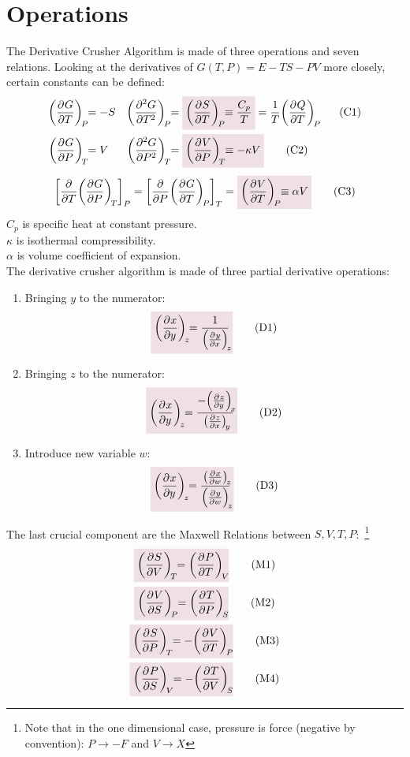 \documentclass{article}
\begin{document}
\section*{Operations}
    The Derivative Crusher Algorithm is made of three operations and seven relations. 
    Looking at the derivatives of $G(T,P)=E-TS-PV$ more closely, certain constants can be defined: 
    \begin{align*}
        \pder{G}{T}[P]&=-S & \pder[2]{G}{T}[P]&=\coloredanswer{\pder{S}{T}[P]\equiv\frac{C_p}{T}}=\oo{T}\pder{Q}{T}[P]\tag{C1}\label{C1}
        \\
        \pder{G}{P}[T]&=V & \pder[2]{G}{P}[T]&=\coloredanswer{\pder{V}{P}[T]\equiv-\kappa V}\tag{C2}\label{C2}
    \end{align*}
    \begin{equation*}
        \qty[\pder{T}\pder{G}{P}[T]~]_{P}=\qty[\pder{P}\pder{G}{T}[P]~]_{T}=\coloredanswer{\pder{V}{T}[P]\equiv \alpha V}\tag{C3}\label{C3} %
    \end{equation*}
    $C_p$ is specific heat at constant pressure. 
    \\
    $\kappa$ is isothermal compressibility.
    \\
    $\alpha$ is volume coefficient of expansion.
    \\
    The derivative crusher algorithm is made of three partial derivative operations:
    \begin{enumerate}
        \item Bringing $y$ to the numerator:
        \begin{equation*}
            \coloredanswer{\pder{x}{y}[z]=\oo{\pder{y}{x}[z]}}\tag{D1}\label{D1}
        \end{equation*}
        \item Bringing $z$ to the numerator:
        \begin{equation*}
            \coloredanswer{\pder{x}{y}[z]=\frac{-\pder{z}{y}[x]}{\pder{z}{x}[y]}}\tag{D2}\label{D2}
        \end{equation*}
        \item Introduce new variable $w$:
        \begin{equation*}
            \coloredanswer{\pder{x}{y}[z]=\frac{\pder{x}{w}[z]}{\pder{y}{w}[z]}}\tag{D3}\label{D3}
        \end{equation*}
    \end{enumerate}
    The last crucial component are the Maxwell Relations between $S,V,T,P$:~\footnote{Note that in the one dimensional case, pressure is force (negative by convention): $P\rightarrow -F$ and $V\rightarrow X$}
    \begin{gather*}
        \coloredanswer{\pder{S}{V}[T]=\pder{P}{T}[V]}\tag{M1}\label{M1} %
        \\
        \coloredanswer{\pder{V}{S}[P]=\pder{T}{P}[S]}\tag{M2}\label{M2}
        \\
        \coloredanswer{\pder{S}{P}[T]=-\pder{V}{T}[P]}\tag{M3}\label{M3}
        \\
        \coloredanswer{\pder{P}{S}[V]=-\pder{T}{V}[S]}\tag{M4}\label{M4}
    \end{gather*}
    \newpage
\end{document}
